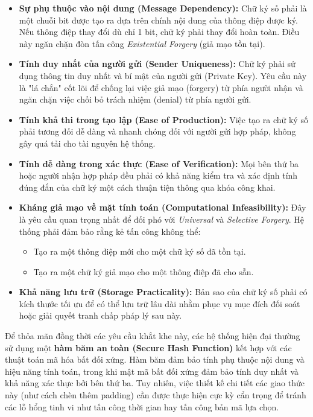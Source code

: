 \begin{itemize}
    \item \textbf{Sự phụ thuộc vào nội dung (Message Dependency):} Chữ ký số phải là một chuỗi bit được tạo ra dựa trên chính nội dung của thông điệp được ký. Nếu thông điệp thay đổi dù chỉ 1 bit, chữ ký phải thay đổi hoàn toàn. Điều này ngăn chặn đòn tấn công \textit{Existential Forgery} (giả mạo tồn tại).
    \item \textbf{Tính duy nhất của người gửi (Sender Uniqueness):} Chữ ký phải sử dụng thông tin duy nhất và bí mật của người gửi (Private Key). Yêu cầu này là "lá chắn" cốt lõi để chống lại việc giả mạo (forgery) từ phía người nhận và ngăn chặn việc chối bỏ trách nhiệm (denial) từ phía người gửi.
    \item \textbf{Tính khả thi trong tạo lập (Ease of Production):} Việc tạo ra chữ ký số phải tương đối dễ dàng và nhanh chóng đối với người gửi hợp pháp, không gây quá tải cho tài nguyên hệ thống.
    \item \textbf{Tính dễ dàng trong xác thực (Ease of Verification):} Mọi bên thứ ba hoặc người nhận hợp pháp đều phải có khả năng kiểm tra và xác định tính đúng đắn của chữ ký một cách thuận tiện thông qua khóa công khai.
    \item \textbf{Kháng giả mạo về mặt tính toán (Computational Infeasibility):} Đây là yêu cầu quan trọng nhất để đối phó với \textit{Universal} và \textit{Selective Forgery}. Hệ thống phải đảm bảo rằng kẻ tấn công không thể:
    \begin{itemize}
        \item Tạo ra một thông điệp mới cho một chữ ký số đã tồn tại.
        \item Tạo ra một chữ ký giả mạo cho một thông điệp đã cho sẵn.
    \end{itemize}
    \item \textbf{Khả năng lưu trữ (Storage Practicality):} Bản sao của chữ ký số phải có kích thước tối ưu để có thể lưu trữ lâu dài nhằm phục vụ mục đích đối soát hoặc giải quyết tranh chấp pháp lý sau này.
\end{itemize}
Để thỏa mãn đồng thời các yêu cầu khắt khe này, các hệ thống hiện đại thường sử dụng một \textbf{hàm băm an toàn (Secure Hash Function)} kết hợp với các thuật toán mã hóa bất đối xứng. Hàm băm đảm bảo tính phụ thuộc nội dung và hiệu năng tính toán, trong khi mật mã bất đối xứng đảm bảo tính duy nhất và khả năng xác thực bởi bên thứ ba. Tuy nhiên, việc thiết kế chi tiết các giao thức này (như cách chèn thêm padding) cần được thực hiện cực kỳ cẩn trọng để tránh các lỗ hổng tinh vi như tấn công thời gian hay tấn công bản mã lựa chọn.


